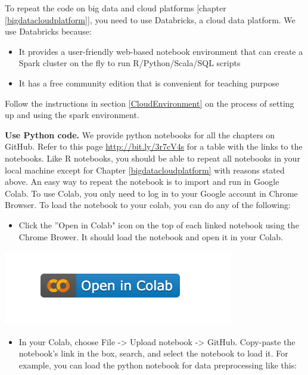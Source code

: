 \documentclass[12pt,]{krantz}
\providecommand{\tightlist}{%
  \setlength{\itemsep}{0pt}\setlength{\parskip}{0pt}}
\begin{document}
To repeat the code on big data and cloud platforms {[}chapter \ref{bigdatacloudplatform}{]}, you need to use Databricks, a cloud data platform. We use Databricks because:

\begin{itemize}
\tightlist
\item
  It provides a user-friendly web-based notebook environment that can create a Spark cluster on the fly to run R/Python/Scala/SQL scripts
\item
  It has a free community edition that is convenient for teaching purpose
\end{itemize}

Follow the instructions in section \ref{CloudEnvironment} on the process of setting up and using the spark environment.

\textbf{Use Python code.} We provide python notebooks for all the chapters on GitHub. Refer to this page \url{http://bit.ly/3r7cV4s} for a table with the links to the notebooks. Like R notebooks, you should be able to repeat all notebooks in your local machine except for Chapter \ref{bigdatacloudplatform} with reasons stated above. An easy way to repeat the notebook is to import and run in Google Colab. To use Colab, you only need to log in to your Google account in Chrome Browser. To load the notebook to your colab, you can do any of the following:

\begin{itemize}
\tightlist
\item
  Click the ''Open in Colab" icon on the top of each linked notebook using the Chrome Brower. It should load the notebook and open it in your Colab.
\end{itemize}

\begin{center}\includegraphics[width=0.35\linewidth]{images/colabicon} \end{center}

\begin{itemize}
\tightlist
\item
  In your Colab, choose File -\textgreater{} Upload notebook -\textgreater{} GitHub. Copy-paste the notebook's link in the box, search, and select the notebook to load it. For example, you can load the python notebook for data preprocessing like this:
\end{itemize}
\end{document}
